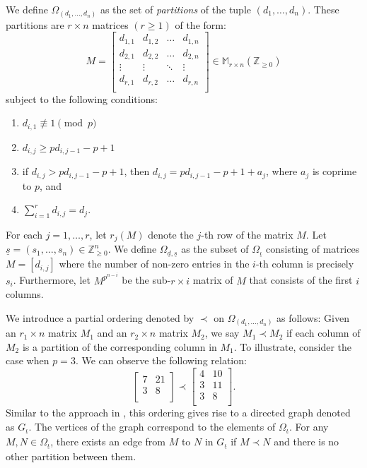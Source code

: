 \documentclass{compositio}
\theoremstyle{remark}
\theoremstyle{remark}
\begin{document}
We define $\Omega_{(d_1,\ldots,d_n)}$ as the set of \textit{partitions} of the tuple $(d_1,\ldots,d_n)$. These partitions are $r\times n$ matrices $(r \geq 1)$ of the form:
               \[ M=\begin{bmatrix}\label{matrixpartition}
d_{1,1} & d_{1,2} & \ldots & d_{1,n} \\
d_{2,1} & d_{2,2} & \ldots & d_{2,n} \\
\vdots  & \vdots  & \ddots & \vdots  \\
d_{r,1} & d_{r,2} & \ldots & d_{r,n} \\
\end{bmatrix} \in \mathbb{M}_{r \times n}(\mathbb{Z}_{\ge 0}) \]
subject to the following conditions:
\begin{enumerate}[label*=\arabic*.]
\item \label{item1condbranchingdatum} $d_{i,1} \not\equiv 1 \pmod{p}$
\item \label{item2condbranchingdatum} $d_{i,j} \geq pd_{i,j-1}-p+1$
\item \label{item3condbranchingdatum} if $d_{i,j}>pd_{i,j-1}-p+1$, then $d_{i,j}=pd_{i,j-1}-p+1+a_j$, where $a_j$ is coprime to $p$, and 
\item \label{item4condbranchingdatum} $\sum_{i=1}^r d_{i,j}=d_j$.
\end{enumerate}
For each $j=1,\ldots,r$, let $r_j(M)$ denote the $j$-th row of the matrix $M$. Let $\underline{s}=(s_1, \ldots, s_n) \in \mathbb{Z}_{\ge 0}^n$. We define $\Omega_{\underline{d}, \underline{s}}$ as the subset of $\Omega_{\underline{\iota}}$ consisting of matrices $M=[d_{i,j}]$ where the number of non-zero entries in the $i$-th column is precisely $s_i$. Furthermore, let $M^{p^{n-i}}$ be the sub-$r \times i$ matrix of $M$ that consists of the first $i$ columns.

We introduce a partial ordering denoted by $\prec$ on $\Omega_{(d_1,\ldots,d_n)}$ as follows: Given an $r_1\times n$ matrix $M_1$ and an $r_2\times n$ matrix $M_2$, we say $M_1 \prec M_2$ if each column of $M_2$ is a partition of the corresponding column in $M_1$. To illustrate, consider the case when $p=3$. We can observe the following relation:
\[  \begin{bmatrix}
7 & 21 \\
3 & 8 \\
\end{bmatrix} \prec \begin{bmatrix}
   4 & 10 \\
   3 & 11 \\
   3 & 8\\
   \end{bmatrix}.  \]
Similar to the approach in \cite{MR2985514}, this ordering gives rise to a directed graph denoted as $G_{\underline{\iota}}$. The vertices of the graph correspond to the elements of $\Omega_{\underline{\iota}}$. For any $M, N \in \Omega_{\underline{\iota}}$, there exists an edge from $M$ to $N$ in $G_{\underline{\iota}}$ if $M \prec N$ and there is no other partition between them.
\end{document}
